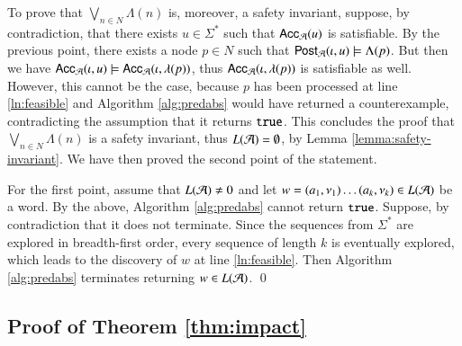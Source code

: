 \documentclass[10pt,conference,letterpaper,twocolumn]{IEEEtran}
\begin{document}
{  To prove that $\bigvee_{n \in N} \Lambda(n)$ is, moreover, a safety
  invariant, suppose, by contradiction, that there exists $u \in
  \Sigma^*$ such that $\mathsf{Acc}_{\mathcal{A}}(u)$ is satisfiable. By the previous
  point, there exists a node $p \in N$ such that $\mathsf{Post}_{\mathcal{A}}(\iota,u)
  \models \Lambda(p)$. But then we have $\mathsf{Acc}_{\mathcal{A}}(\iota,u) \models
  \mathsf{Acc}_{\mathcal{A}}(\iota,\lambda(p))$, thus $\mathsf{Acc}_{\mathcal{A}}(\iota,\lambda(p))$
  is satisfiable as well. However, this cannot be the case, because
  $p$ has been processed at line \ref{ln:feasible} and Algorithm
  \ref{alg:predabs} would have returned a counterexample,
  contradicting the assumption that it returns $\mathtt{true}$. This concludes
  the proof that $\bigvee_{n\in N} \Lambda(n)$ is a safety invariant,
  thus $L(\mathcal{A}) = \emptyset$, by Lemma \ref{lemma:safety-invariant}. We
  have then proved the second point of the statement.

  For the first point, assume that $L(\mathcal{A}) \neq 0$ and let $w =
  (a_1,\nu_1) \ldots (a_k,\nu_k) \in L(\mathcal{A})$ be a word. By the above,
  Algorithm \ref{alg:predabs} cannot return $\mathtt{true}$. Suppose, by
  contradiction that it does not terminate. Since the sequences from
  $\Sigma^*$ are explored in breadth-first order, every sequence of
  length $k$ is eventually explored, which leads to the discovery of
  $w$ at line \ref{ln:feasible}. Then Algorithm \ref{alg:predabs}
  terminates returning $w \in L(\mathcal{A})$. \qed}

\subsection{Proof of Theorem \ref{thm:impact}}
\end{document}
